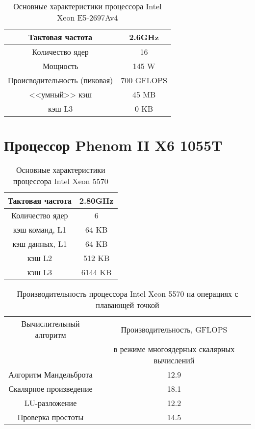 \begin{table}[ht]
	\begin{center}
		\caption{Основные характеристики процессора Intel Xeon  E5-2697Av4}
		\begin{tabular}{|c|c|}
			\hline	
			Тактовая частота & 2.6GHz   \\ \hline
			Количество ядер & 16 	     \\ \hline
			Мощность        &  145 W      \\ \hline
			Происводительность (пиковая) &  700 GFLOPS       \\ \hline
			<<умный>> кэш   &  45 MB      \\ \hline
			кэш L3          &  0 KB        \\ \hline
		\end{tabular}
	\end{center} 	
\end{table} 	





\section{Процессор Phenom II X6 1055T}
\label{app_phenom}
\begin{table}[ht]
	\begin{center}
		\caption{Основные характеристики процессора Intel Xeon  5570}
		\begin{tabular}{|c|c|}
			\hline	
			Тактовая частота & 2.80GHz   \\ \hline
			Количество ядер & 6 	     \\ \hline
			кэш команд, L1 &  64 KB      \\ \hline
			кэш данных, L1 &  64 KB       \\ \hline
			кэш L2         &  512 KB      \\ \hline
			кэш L3         &  6144 KB        \\ \hline
		\end{tabular}
	\end{center} 	
\end{table} 	

\begin{table}[ht]
	\begin{center}
		\caption{Производительность процессора Intel Xeon  5570 на операциях с плавающей точкой}
		\begin{tabular}{|c|c|}
			\hline	
			Вычислительный алгоритм &  Производительность, GFLOPS \\ 
			& в режиме многоядерных скалярных вычислений \\ \hline
			Алгоритм Мандельброта  &  12.9 	\\ \hline
			Скалярное произведение &  18.1   \\ \hline
			LU-разложение          &  12.2  \\ \hline
			Проверка простоты      &  14.5  \\ \hline 
			
			
		\end{tabular}
	\end{center} 	
\end{table} 	

